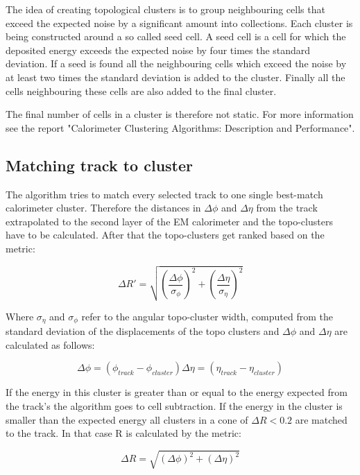The idea of creating topological clusters is to group neighbouring cells that exceed the expected noise by a significant amount into collections. 
Each cluster is being constructed around a so called seed cell. A seed cell is a cell for which the deposited energy exceeds the expected noise by four times the standard deviation. If a seed is found all the neighbouring cells which exceed the noise by at least two times the standard deviation is added to the cluster. Finally all the cells neighbouring these cells are also added to the final cluster.

The final number of cells in a cluster is therefore not static. For more information see the report "Calorimeter Clustering Algorithms: Description and Performance"\cite{cluster08}.


\subsection{Matching track to cluster}

The algorithm tries to match every selected track to one single best-match calorimeter cluster. 
Therefore the distances in $\Delta \phi$ and $\Delta \eta$ from the track extrapolated to the second layer of the EM calorimeter and the topo-clusters have to be calculated. After that the topo-clusters get ranked based on the metric:

\begin{equation}
\Delta R' = \sqrt{\left(\frac{\Delta \phi}{\sigma_{\phi}}\right)^2+\left(\frac{\Delta \eta}{\sigma_{\eta}}\right)^2}
\end{equation}

Where $\sigma_{\eta}$ and $\sigma_{\phi}$ refer to the angular topo-cluster width, computed from the standard deviation of the displacements of the topo clusters and $\Delta \phi$ and $\Delta \eta$ are calculated as follows:

\begin{equation}
\Delta \phi = (\phi_{track} - \phi_{cluster})
\Delta \eta = (\eta_{track} - \eta_{cluster})
\end{equation}

If the energy in this cluster is greater than or equal to the energy expected from the track's \pT the algorithm goes to cell subtraction. If the energy in the cluster is smaller than the expected energy all clusters in a cone of $\Delta R < 0.2$ are matched to the track. In that case R is calculated by the metric:

\begin{equation}
\Delta R = \sqrt{(\Delta \phi)^2 + (\Delta \eta)^2}
\end{equation}

